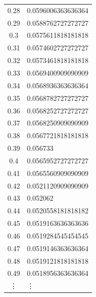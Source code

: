\documentclass[11pt]{extarticle}
\begin{document}
\begin{enumerate}[(a)]
\begin{table}[ht!]
\begin{minipage}{0.5\textwidth}
\begin{tabular}{cl}
0.28 & 0.0596006363636364 \\
0.29 & 0.0588762727272727 \\
0.3 & 0.0575611818181818 \\
0.31 & 0.0574602727272727 \\
0.32 & 0.0573461818181818 \\
0.33 & 0.0569400909090909 \\
0.34 & 0.0568936363636364 \\
0.35 & 0.0568782727272727 \\
0.36 & 0.0568252727272727 \\
0.37 & 0.0568250909090909 \\
0.38 & 0.0567721818181818 \\
0.39 & 0.056733 \\
0.4 & 0.0565952727272727 \\
0.41 & 0.0565560909090909 \\
0.42 & 0.0521120909090909 \\
0.43 & 0.052062 \\
0.44 & 0.0520558181818182 \\
0.45 & 0.0519163636363636 \\
0.46 & 0.0519284545454545 \\
0.47 & 0.0519146363636364 \\
0.48 & 0.0519121818181818 \\
0.49 & 0.0518956363636364 \\
\vdots & \vdots \\
\toprule
\end{tabular}

\end{minipage} \hfill
\begin{minipage}{0.4\textwidth}


\end{minipage}
\end{table}
\end{enumerate}
\end{document}
